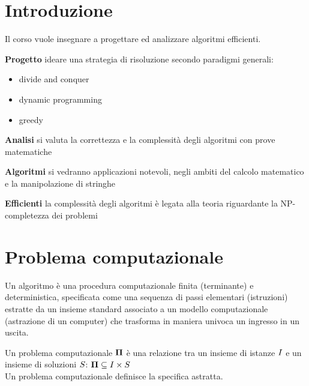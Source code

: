 \section{Introduzione}

Il corso vuole insegnare a progettare ed analizzare algoritmi efficienti.

\begin{description}
    \item{\textbf{Progetto}} ideare una strategia di risoluzione secondo paradigmi generali:
        \begin{itemize}
            \item divide and conquer
            \item dynamic programming
            \item greedy
        \end{itemize}
    \item{\textbf{Analisi}} si valuta la correttezza e la complessità degli algoritmi con prove matematiche
    \item{\textbf{Algoritmi}} si vedranno applicazioni notevoli, negli ambiti del calcolo matematico e la manipolazione di stringhe
    \item{\textbf{Efficienti}} la complessità degli algoritmi è legata alla teoria riguardante la NP-completezza dei problemi
\end{description}

\section{Problema computazionale}

\begin{definition}[Algoritmo]\label{def:alg}
    Un algoritmo è una procedura computazionale finita (terminante) e deterministica, specificata come una sequenza di passi elementari (istruzioni) estratte da un insieme standard associato a un modello computazionale (astrazione di un computer) che trasforma in maniera univoca un ingresso in un uscita.
\end{definition}


\begin{definition}\label{def:probcomp}
    Un problema computazionale $\bm{\Pi}{}$ è una relazione tra un insieme di istanze $I{}$ e un insieme di soluzioni $S{}$: $\bm{\Pi}{} \subseteq I{} \times S{}$
    \\
    Un problema computazionale definisce la specifica astratta. %
\end{definition}

